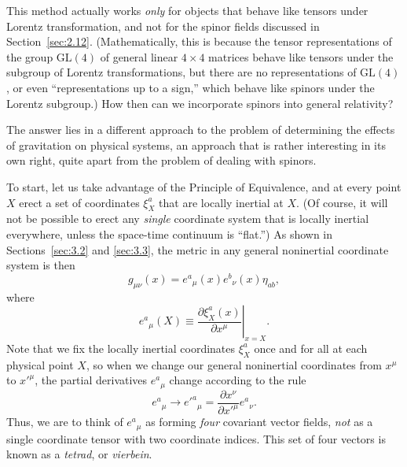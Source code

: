 This method actually works \emph{only} for objects that behave like tensors
under Lorentz transformation, and not for the spinor fields discussed in
Section~\ref{sec:2.12}. (Mathematically, this is because the tensor
representations of the group \(\mathrm{GL}(4)\) of general linear
\(4\times4\) matrices behave like tensors under the subgroup of Lorentz
transformations, but there are no representations of \(\mathrm{GL}(4)\), or
even ``representations up to a sign,'' which behave like spinors under the
Lorentz subgroup.) How then can we incorporate spinors into general
relativity?

The answer lies in a different approach to the problem of determining the
effects of gravitation on physical systems, an approach that is rather
interesting in its own right, quite apart from the problem of dealing with
spinors.

To start, let us take advantage of the Principle of Equivalence, and at every
point \(X\) erect a set of coordinates \(\xi_X^a\) that are locally inertial
at \(X\). (Of course, it will not be possible to erect any \emph{single}
coordinate system that is locally inertial everywhere, unless the space-time
continuum is ``flat.'') As shown in Sections~\ref{sec:3.2} and \ref{sec:3.3},
the metric in any general noninertial coordinate system is then
\begin{equation}
  g_{\mu\nu}(x)
  =
  e^a{}_\mu(x)e^b{}_\nu(x)\eta_{ab},
  \tag{12.5.1}\label{eq:12.5.1}
\end{equation}
where
\begin{equation}
  e^a{}_\mu(X)
  \equiv
  \left.
  \frac{\partial\xi_X^a(x)}{\partial x^\mu}
  \right|_{x=X}.
  \tag{12.5.2}\label{eq:12.5.2}
\end{equation}
Note that we fix the locally inertial coordinates \(\xi_X^a\) once and for
all at each physical point \(X\), so when we change our general noninertial
coordinates from \(x^\mu\) to \(x'^\mu\), the partial derivatives
\(e^a{}_\mu\) change according to the rule
\begin{equation}
  e^a{}_\mu
  \longrightarrow
  e'^a{}_\mu
  =
  \frac{\partial x^\nu}{\partial x'^\mu}e^a{}_\nu.
  \tag{12.5.3}\label{eq:12.5.3}
\end{equation}
Thus, we are to think of \(e^a{}_\mu\) as forming \emph{four} covariant
vector fields, \emph{not} as a single coordinate tensor with two coordinate
indices. This set of four vectors is known as a \emph{tetrad}, or
\emph{vierbein}.

